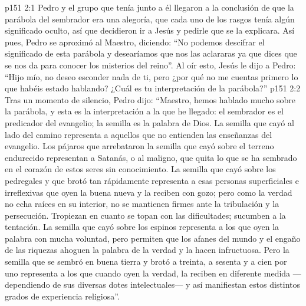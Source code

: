 \vs p151 2:1 Pedro y el grupo que tenía junto a él llegaron a la conclusión de que la parábola del sembrador era una alegoría, que cada uno de los rasgos tenía algún significado oculto, así que decidieron ir a Jesús y pedirle que se la explicara. Así pues, Pedro se aproximó al Maestro, diciendo: “No podemos descifrar el significado de esta parábola y desearíamos que nos las aclararas ya que dices que se nos da para conocer los misterios del reino”. Al oír esto, Jesús le dijo a Pedro: “Hijo mío, no deseo esconder nada de ti, pero ¿por qué no me cuentas primero lo que habéis estado hablando? ¿Cuál es tu interpretación de la parábola?”
\vs p151 2:2 Tras un momento de silencio, Pedro dijo: “Maestro, hemos hablado mucho sobre la parábola, y esta es la interpretación a la que he llegado: el sembrador es el predicador del evangelio; la semilla es la palabra de Dios. La semilla que cayó al lado del camino representa a aquellos que no entienden las enseñanzas del evangelio. Los pájaros que arrebataron la semilla que cayó sobre el terreno endurecido representan a Satanás, o al maligno, que quita lo que se ha sembrado en el corazón de estos seres sin conocimiento. La semilla que cayó sobre los pedregales y que brotó tan rápidamente representa a esas personas superficiales e irreflexivas que oyen la buena nueva y la reciben con gozo; pero como la verdad no echa raíces en su interior, no se mantienen firmes ante la tribulación y la persecución. Tropiezan en cuanto se topan con las dificultades; sucumben a la tentación. La semilla que cayó sobre los espinos representa a los que oyen la palabra con mucha voluntad, pero permiten que los afanes del mundo y el engaño de las riquezas ahoguen la palabra de la verdad y la hacen infructuosa. Pero la semilla que se sembró en buena tierra y brotó a treinta, a sesenta y a cien por uno representa a los que cuando oyen la verdad, la reciben en diferente medida ---dependiendo de sus diversas dotes intelectuales--- y así manifiestan estos distintos grados de experiencia religiosa”.
